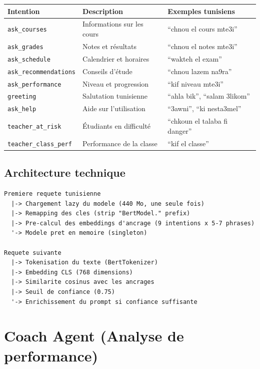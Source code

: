 \documentclass[12pt,a4paper]{article}
\begin{document}
\begin{longtable}{@{}p{4cm}p{5cm}p{5.5cm}@{}}
\toprule
\textbf{Intention} & \textbf{Description} & \textbf{Exemples tunisiens} \\
\midrule
\endhead
\texttt{ask\_courses} & Informations sur les cours & ``chnou el cours mte3i'' \\
\texttt{ask\_grades} & Notes et résultats & ``chnou el notes mte3i'' \\
\texttt{ask\_schedule} & Calendrier et horaires & ``wakteh el exam'' \\
\texttt{ask\_recommendations} & Conseils d'étude & ``chnou lazem na9ra'' \\
\texttt{ask\_performance} & Niveau et progression & ``kif niveau mte3i'' \\
\texttt{greeting} & Salutation tunisienne & ``ahla bik'', ``salam 3likom'' \\
\texttt{ask\_help} & Aide sur l'utilisation & ``3awni'', ``ki nesta3mel'' \\
\texttt{teacher\_at\_risk} & Étudiants en difficulté & ``chkoun el talaba fi danger'' \\
\texttt{teacher\_class\_perf} & Performance de la classe & ``kif el classe'' \\
\bottomrule
\end{longtable}

\subsection{Architecture technique}

\begin{lstlisting}[language={},caption={Chargement et classification TunBERT}]
Premiere requete tunisienne
  |-> Chargement lazy du modele (440 Mo, une seule fois)
  |-> Remapping des cles (strip "BertModel." prefix)
  |-> Pre-calcul des embeddings d'ancrage (9 intentions x 5-7 phrases)
  '-> Modele pret en memoire (singleton)

Requete suivante
  |-> Tokenisation du texte (BertTokenizer)
  |-> Embedding CLS (768 dimensions)
  |-> Similarite cosinus avec les ancrages
  |-> Seuil de confiance (0.75)
  '-> Enrichissement du prompt si confiance suffisante
\end{lstlisting}

\section{Coach Agent (Analyse de performance)}
\end{document}
